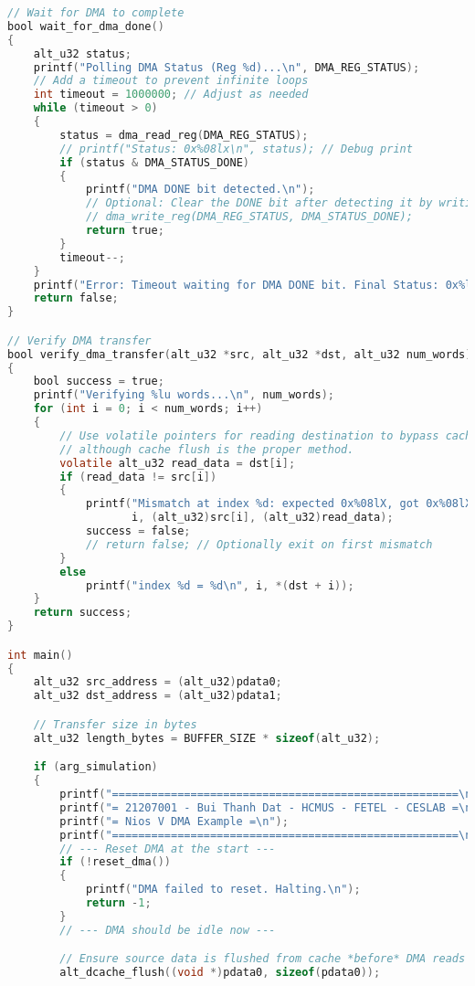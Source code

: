 \begin{lstlisting}[language=C, caption={hello\_world.c - Nios V DMA Test Application}, label=lst:c_helloworld]
// Wait for DMA to complete
bool wait_for_dma_done()
{
    alt_u32 status;
    printf("Polling DMA Status (Reg %d)...\n", DMA_REG_STATUS);
    // Add a timeout to prevent infinite loops
    int timeout = 1000000; // Adjust as needed
    while (timeout > 0)
    {
        status = dma_read_reg(DMA_REG_STATUS);
        // printf("Status: 0x%08lx\n", status); // Debug print
        if (status & DMA_STATUS_DONE)
        {
            printf("DMA DONE bit detected.\n");
            // Optional: Clear the DONE bit after detecting it by writing 1 to it
            // dma_write_reg(DMA_REG_STATUS, DMA_STATUS_DONE);
            return true;
        }
        timeout--;
    }
    printf("Error: Timeout waiting for DMA DONE bit. Final Status: 0x%lx\n", status);
    return false;
}

// Verify DMA transfer
bool verify_dma_transfer(alt_u32 *src, alt_u32 *dst, alt_u32 num_words)
{
    bool success = true;
    printf("Verifying %lu words...\n", num_words);
    for (int i = 0; i < num_words; i++)
    {
        // Use volatile pointers for reading destination to bypass cache optimization if needed,
        // although cache flush is the proper method.
        volatile alt_u32 read_data = dst[i];
        if (read_data != src[i])
        {
            printf("Mismatch at index %d: expected 0x%08lX, got 0x%08lX\n",
                   i, (alt_u32)src[i], (alt_u32)read_data);
            success = false;
            // return false; // Optionally exit on first mismatch
        }
        else
        	printf("index %d = %d\n", i, *(dst + i));
    }
    return success;
}

int main()
{
    alt_u32 src_address = (alt_u32)pdata0;
    alt_u32 dst_address = (alt_u32)pdata1;

    // Transfer size in bytes
    alt_u32 length_bytes = BUFFER_SIZE * sizeof(alt_u32);

    if (arg_simulation)
    {
        printf("=====================================================\n");
        printf("= 21207001 - Bui Thanh Dat - HCMUS - FETEL - CESLAB =\n");
        printf("= Nios V DMA Example =\n");
        printf("=====================================================\n");
        // --- Reset DMA at the start ---
        if (!reset_dma())
        {
            printf("DMA failed to reset. Halting.\n");
            return -1;
        }
        // --- DMA should be idle now ---

        // Ensure source data is flushed from cache *before* DMA reads it
        alt_dcache_flush((void *)pdata0, sizeof(pdata0));


\end{lstlisting}
